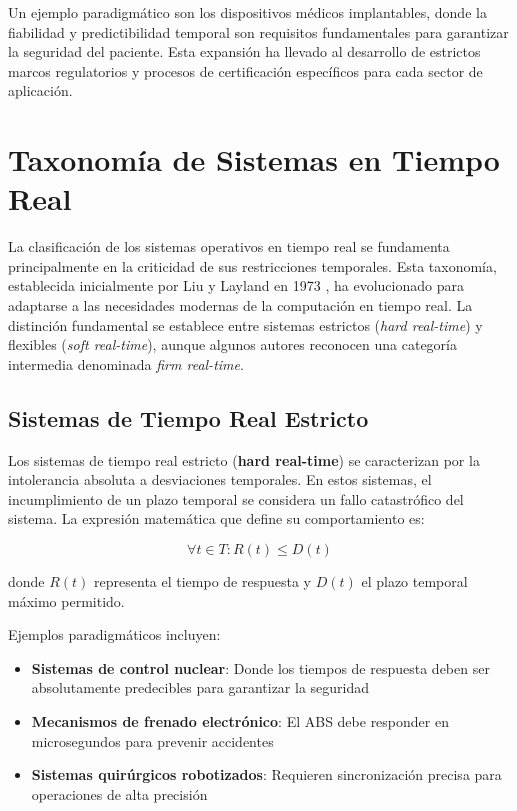 Un ejemplo paradigmático son los dispositivos médicos implantables, donde la fiabilidad y predictibilidad temporal son requisitos fundamentales para garantizar la seguridad del paciente. Esta expansión ha llevado al desarrollo de estrictos marcos regulatorios y procesos de certificación específicos para cada sector de aplicación.


\newpage
\section{Taxonomía de Sistemas en Tiempo Real}

La clasificación de los sistemas operativos en tiempo real se fundamenta principalmente en la criticidad de sus restricciones temporales. Esta taxonomía, establecida inicialmente por Liu y Layland en 1973 \cite{Siewert_Pratt_2016}, ha evolucionado para adaptarse a las necesidades modernas de la computación en tiempo real. La distinción fundamental se establece entre sistemas estrictos (\textit{hard real-time}) y flexibles (\textit{soft real-time}), aunque algunos autores reconocen una categoría intermedia denominada \textit{firm real-time}.

    \subsection{Sistemas de Tiempo Real Estricto}
    Los sistemas de tiempo real estricto (\textbf{hard real-time}) se caracterizan por la intolerancia absoluta a desviaciones temporales. En estos sistemas, el incumplimiento de un plazo temporal se considera un fallo catastrófico del sistema. La expresión matemática que define su comportamiento es:

    \begin{equation}
    \forall t \in T: R(t) \leq D(t)
    \end{equation}

    donde $R(t)$ representa el tiempo de respuesta y $D(t)$ el plazo temporal máximo permitido.

    Ejemplos paradigmáticos incluyen:
    \begin{itemize}
        \item \textbf{Sistemas de control nuclear}: Donde los tiempos de respuesta deben ser absolutamente predecibles para garantizar la seguridad
        \item \textbf{Mecanismos de frenado electrónico}: El ABS debe responder en microsegundos para prevenir accidentes
        \item \textbf{Sistemas quirúrgicos robotizados}: Requieren sincronización precisa para operaciones de alta precisión
    \end{itemize}

